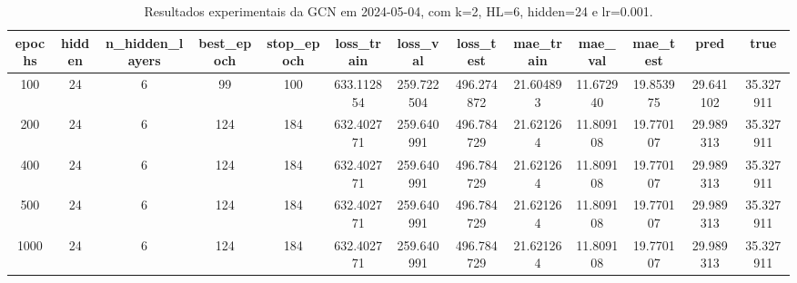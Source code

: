 \begin{table}[h]
\centering
\caption{Resultados experimentais da GCN em 2024-05-04, com k=2, HL=6, hidden=24 e lr=0.001.}
\label{tab:gcn_results_k2_hl6_h24_d20240504}
\begin{tabular}{ccccccccccccc}
\toprule
epochs & hidden & n\_hidden\_layers & best\_epoch & stop\_epoch & loss\_train & loss\_val & loss\_test & mae\_train & mae\_val & mae\_test & pred & true \\
\midrule
100 & 24 & 6 & 99 & 100 & 633.112854 & 259.722504 & 496.274872 & 21.604893 & 11.672940 & 19.853975 & 29.641102 & 35.327911 \\
200 & 24 & 6 & 124 & 184 & 632.402771 & 259.640991 & 496.784729 & 21.621264 & 11.809108 & 19.770107 & 29.989313 & 35.327911 \\
400 & 24 & 6 & 124 & 184 & 632.402771 & 259.640991 & 496.784729 & 21.621264 & 11.809108 & 19.770107 & 29.989313 & 35.327911 \\
500 & 24 & 6 & 124 & 184 & 632.402771 & 259.640991 & 496.784729 & 21.621264 & 11.809108 & 19.770107 & 29.989313 & 35.327911 \\
1000 & 24 & 6 & 124 & 184 & 632.402771 & 259.640991 & 496.784729 & 21.621264 & 11.809108 & 19.770107 & 29.989313 & 35.327911 \\
\bottomrule
\end{tabular}
\end{table}
